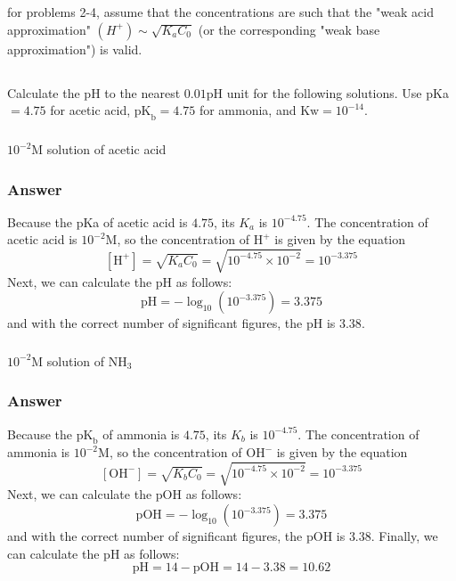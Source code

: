 \documentclass[12pt]{article}
\begin{document}
\section{}


for problems 2-4, assume that the concentrations are such that the "weak acid approximation" $\left(H^{+}\right) \sim \sqrt{K_{a} C_{0}}$ (or the corresponding "weak base approximation") is valid.
\subsection{}
Calculate the $\mathrm{pH}$ to the nearest $0.01 \mathrm{pH}$ unit for the following solutions. Use pKa $=4.75$ for acetic acid, $\mathrm{pK}_{\mathrm{b}}=4.75$ for ammonia, and $\mathrm{Kw}=10^{-14}$.
\subsubsection{}
$10^{-2} \mathrm{M}$ solution of acetic acid
\subsubsection{Answer}
Because the pKa of acetic acid is $4.75$, its $K_{a}$ is $10^{-4.75}$. The concentration of acetic acid is $10^{-2} \mathrm{M}$, so the concentration of $\mathrm{H}^{+}$ is given by the equation
\begin{equation}
  \left[\mathrm{H}^{+}\right]=\sqrt{K_{a} C_{0}}=\sqrt{10^{-4.75} \times 10^{-2}}=10^{-3.375}
\end{equation}
Next, we can calculate the $\mathrm{pH}$ as follows:
\begin{equation}
  \mathrm{pH}=-\log _{10}\left(10^{-3.375}\right)=3.375
\end{equation}
and with the correct number of significant figures, the $\mathrm{pH}$ is $3.38$.
\subsubsection{}
$10^{-2} \mathrm{M}$ solution of $\mathrm{NH}_{3}$
\subsubsection{Answer}
Because the $\mathrm{pK}_{\mathrm{b}}$ of ammonia is $4.75$, its $K_{b}$ is $10^{-4.75}$. The concentration of ammonia is $10^{-2} \mathrm{M}$, so the concentration of $\mathrm{OH}^{-}$ is given by the equation
\begin{equation}
  \left[\mathrm{OH}^{-}\right]=\sqrt{K_{b} C_{0}}=\sqrt{10^{-4.75} \times 10^{-2}}=10^{-3.375}
\end{equation}
Next, we can calculate the $\mathrm{pOH}$ as follows:
\begin{equation}
  \mathrm{pOH}=-\log _{10}\left(10^{-3.375}\right)=3.375
\end{equation}
and with the correct number of significant figures, the $\mathrm{pOH}$ is $3.38$. Finally, we can calculate the $\mathrm{pH}$ as follows:
\begin{equation}
  \mathrm{pH}=14-\mathrm{pOH}=14-3.38=10.62
\end{equation}
\end{document}
